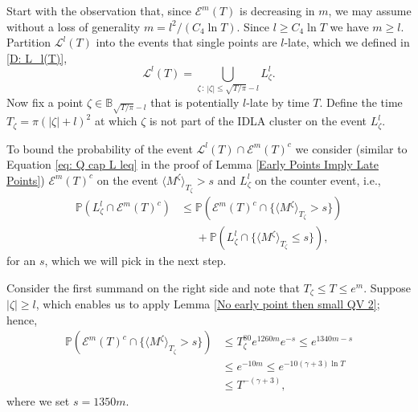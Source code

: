 \documentclass[11pt]{article}
\makeatletter
\renewenvironment{proof}[1][\proofname]{
   \par\pushQED{\qed}\normalfont
   \topsep6\p@\@plus6\p@\relax
   \trivlist\item[\hskip\labelsep\bfseries#1\@addpunct{.}]
   \ignorespaces
}{
   \popQED\endtrivlist\@endpefalse
}
\numberwithin{equation}{section}
\def\QV{\langle M ^{\zeta} \rangle}
\makeatother
\begin{document}
\begin{proof}[Proof of Lemma \ref{Late Points Imply Early Points}]
  Start with the observation that, since $\mathcal{E}^m(T)$ is decreasing in $m$,
  we may assume without a loss 
  of generality  $m = l^2 / (C_4 \ln T)$. 
  Since $l \geq C_4 \ln T$ we have $m \geq l$. 
  Partition $\mathcal{L}^l(T)$ into the events 
  that single points are $l$-late, which we defined in \eqref{D: L_l(T)},
  $$
    \mathcal{L}^l(T) = 
    \bigcup_{\zeta \,:\, 
    |\zeta| \leq \sqrt{T/\pi} - l} L^l_{\zeta}.
  $$
  Now fix a point $\zeta \in \mathbb{B}_{\sqrt{T/\pi} - l}$ 
  that is potentially $l$-late by time $T$. 
  Define the time $T_{\zeta} = \pi(|\zeta| + l)^2$ 
  at which $\zeta$ is not part of the IDLA cluster 
  on the event $L^l_{\zeta}$.

  To bound the probability of the event
  $\mathcal{L}^l(T) \cap \mathcal{E}^m(T)^c$ 
  we consider 
  (similar to Equation \eqref{eq: Q cap L leq} in the proof of 
  Lemma \ref{Early Points Imply Late Points}) 
  $\mathcal{E}^m(T)^c$ on the event $\QV_{T_{\zeta}} > s$ and 
  $L^l_{\zeta}$ on the counter event, i.e.,
  \begin{equation}\label{eq: bound L cap EmT^c}
    \begin{split}
      \mathbb{P}(L^l_{\zeta} \cap \mathcal{E}^m(T)^c) 
      & \leq  \mathbb{P}(\mathcal{E}^m(T)^c \cap \{ \QV_{T_{\zeta}} > s\})\\
          & \;\;\;\;\; +\mathbb{P}(L^l_{\zeta} \cap \{ \QV_{T_{\zeta}} \leq s \} ),
    \end{split}
  \end{equation}
  for an $s$, which we will pick in the next step.

  Consider the first summand on the right side and  
  note that $T_{\zeta} \leq T \leq e^m$. 
  Suppose $|\zeta| \geq l$, which enables us to apply 
  Lemma \ref{No early point then small QV 2}; hence, 
  \begin{equation}\label{eq: bound QV on EmT complement}
    \begin{split}
      \mathbb{P}(\mathcal{E}^m(T)^c \cap \{ \QV_{T_{\zeta}} > s\})
        & \leq  T_{\zeta}^{80} e^{1260m} e^{-s} 
        \leq e^{1340 m - s}\\
        &  \leq e^{-10 m}
        \leq e^{-10 (\gamma + 3) \ln T}\\
        &  \leq T^{-(\gamma + 3)}, 
    \end{split}
  \end{equation}
  where we set $s = 1350 m$. 


\end{proof}
\end{document}
